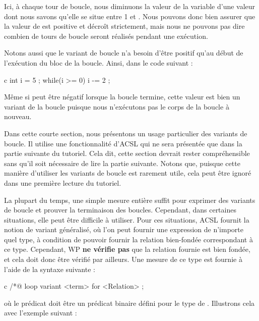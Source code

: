 

Ici, à chaque tour de boucle, nous diminuons la valeur de la variable
 d'une valeur dont nous savons qu'elle se situe entre 1 et
. Nous pouvons donc bien assurer que la valeur de 
est positive et décroît strictement, mais nous ne pouvons pas dire combien de
tours de boucle seront réalisés pendant une exécution.


Notons aussi que le variant de boucle n'a besoin d'être positif qu'au début de
l'exécution du bloc de la boucle. Ainsi, dans le code suivant :


\begin{CodeBlock}{c}
int i = 5 ;
while(i >= 0){
  i -= 2 ;
}
\end{CodeBlock}


Même si  peut être négatif lorsque la boucle termine, cette valeur
est bien un variant de la boucle puisque nous n'exécutons pas le corps de la
boucle à nouveau.


\label{l4:statements-loops-general-measure}


\begin{Information}
  Dans cette courte section, nous présentons un usage particulier des variants
  de boucle. Il utilise une fonctionnalité d'ACSL qui ne sera présentée que dans
  la partie suivante du tutoriel. Cela dit, cette section devrait rester
  compréhensible sans qu'il soit nécessaire de lire la partie suivante. Notons que,
  puisque cette manière d'utiliser les variants de boucle est rarement utile,
  cela peut être ignoré dans une première lecture du tutoriel.
\end{Information}


La plupart du temps, une simple mesure entière suffit pour exprimer des
variants de boucle et prouver la terminaison des boucles. Cependant, dans
certaines situations, elle peut être difficile à utiliser. Pour ces situations,
ACSL fournit la notion de variant généralisé, où l'on peut fournir une expression
de n'importe quel type, à condition de pouvoir fournir la relation bien-fondée
correspondant à ce type. Cependant, WP \textbf{ne vérifie pas} que la relation
fournie est bien fondée, et cela doit donc être vérifié par ailleurs. Une mesure
de ce type est fournie à l'aide de la syntaxe suivante :
\begin{CodeBlock}{c}
/*@ loop variant <term> for <Relation> ;
\end{CodeBlock}
où le prédicat  doit être un prédicat binaire défini pour
le type de . Illustrons cela avec l'exemple suivant :


